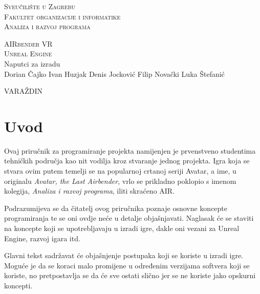 \documentclass[a4paper,10pt]{article}
\begin{document}
\begin{center}
\textsc{Sveučilište u Zagrebu}\\
\textsc{Fakultet organizacije i informatike}\\
\textsc{Analiza i razvoj programa}
\end{center}
\vspace*{7cm}
\begin{center}
	\textsc{\huge AIRbender VR}\\
	\textsc{\large Unreal Engine}\\Naputci za izradu\\
	\vspace*{1cm}
	Dorian Čajko \quad Ivan Huzjak \quad Denis Jocković \quad  Filip
	Novački \quad Luka Štefanić
\end{center}
\hspace*{1cm}

\begin{center}\end{center}
\vspace*{7cm}

\begin{center}
VARA\v{Z}DIN
\end{center}

\pagebreak

\pagestyle{fancy}
\tableofcontents

\pagebreak
{}

\section*{Uvod}

Ovaj priručnik za programiranje projekta namijenjen je prvenstveno studentima
tehničkih područja kao nit vodilja kroz stvaranje jednog projekta. Igra koja se
stvara ovim putem temelji se na popularnoj crtanoj seriji Avatar, a ime, u
originalu \textit{Avatar, the Last Airbender}, vrlo se prikladno poklopio s
imenom kolegija, \textit{Analiza i razvoj programa}, iliti skraćeno
AIR.

Podrazumijeva se da čitatelj ovog priručnika poznaje osnovne koncepte
programiranja te se oni ovdje neće u detalje objašnjavati. Naglasak će se
staviti na koncepte koji se upotrebljavaju u izradi igre, dakle oni vezani za
Unreal Engine, razvoj igara itd.

\marginpar{\color{teal}{Dodatna objašnjenja mogu se vidjeti izdvojena sa strane
kako bi se dodatno povezalo objašnjeno s drugim konceptima.}}
Glavni tekst sadržavat će objašnjenje postupaka koji se koriste u izradi igre.
Moguće je da se koraci malo promijene u određenim verzijama softvera koji se
koriste, no pretpostavlja se da će sve ostati slično jer se ne koriste jako
opskurni koncepti.
\end{document}
